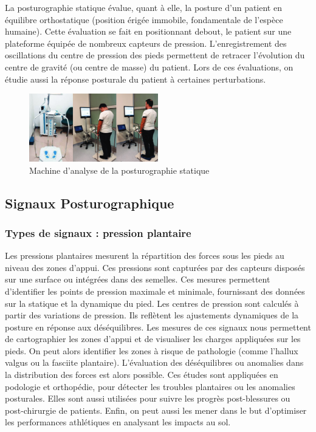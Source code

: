 La posturographie statique évalue, quant à elle, la posture d’un patient en équilibre orthostatique (position érigée immobile, fondamentale de l'espèce humaine). 
Cette évaluation se fait en positionnant debout, le patient sur une plateforme équipée de nombreux capteurs de pression. 
L’enregistrement des oscillations du centre de pression des pieds permettent de retracer l'évolution du centre de gravité (ou centre de masse) du patient. 
Lors de ces évaluations, on étudie aussi la réponse posturale du patient à certaines perturbations.

\begin{figure}[H]                                                                                                                                                                                                             
  \centering
  \includegraphics[width=0.5\textwidth]{images/introduction/statique.png}
  \caption{Machine d’analyse de la posturographie statique }
  \label{fig:posturographie-statique}
\end{figure}

\subsection{Signaux Posturographique}


\subsubsection{Types de signaux : pression plantaire}

Les pressions plantaires mesurent la répartition des forces sous les pieds au niveau des zones d’appui. 
Ces pressions sont capturées par des capteurs disposés 
sur une surface ou intégrées dans des semelles. Ces mesures permettent d’identifier les points de pression maximale et minimale, fournissant des données sur la statique et la dynamique du pied.
Les centres de pression sont calculés à partir des variations de pression. 
Ils reflètent les ajustements dynamiques de la posture en réponse aux déséquilibres. 
Les mesures de ces signaux nous permettent de cartographier les zones d'appui et de visualiser les charges appliquées sur les pieds. 
On peut alors identifier les zones à risque de pathologie (comme l’hallux valgus ou la fasciite plantaire). 
L'évaluation des déséquilibres ou anomalies dans la distribution des forces est alors possible. 
Ces études sont appliquées en podologie et orthopédie, pour détecter les troubles plantaires ou les anomalies posturales. 
Elles sont aussi utilisées pour suivre les progrès post-blessures ou post-chirurgie de patients. 
Enfin, on peut aussi les mener dans le but d’optimiser les performances athlétiques en analysant les impacts au sol.

